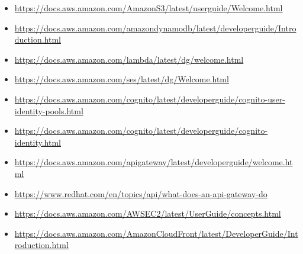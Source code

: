 \begin{itemize}
    \item \href{https://docs.aws.amazon.com/AmazonS3/latest/userguide/Welcome.html}{https://docs.aws.amazon.com/AmazonS3/latest/userguide/Welcome.html}
    \item \href{https://docs.aws.amazon.com/amazondynamodb/latest/developerguide/Introduction.html}{https://docs.aws.amazon.com/amazondynamodb/latest/developerguide/Introduction.html}
    \item \href{https://docs.aws.amazon.com/lambda/latest/dg/welcome.html}{https://docs.aws.amazon.com/lambda/latest/dg/welcome.html}
    \item \href{https://docs.aws.amazon.com/ses/latest/dg/Welcome.html}{https://docs.aws.amazon.com/ses/latest/dg/Welcome.html}
    \item \href{https://docs.aws.amazon.com/cognito/latest/developerguide/cognito-user-identity-pools.html}{https://docs.aws.amazon.com/cognito/latest/developerguide/cognito-user-identity-pools.html}
    \item \href{https://docs.aws.amazon.com/cognito/latest/developerguide/cognito-identity.html}{https://docs.aws.amazon.com/cognito/latest/developerguide/cognito-identity.html}
    \item \href{https://docs.aws.amazon.com/apigateway/latest/developerguide/welcome.html}{https://docs.aws.amazon.com/apigateway/latest/developerguide/welcome.html}
    \item \href{https://www.redhat.com/en/topics/api/what-does-an-api-gateway-do}{https://www.redhat.com/en/topics/api/what-does-an-api-gateway-do}
    \item \href{https://docs.aws.amazon.com/AWSEC2/latest/UserGuide/concepts.html}{https://docs.aws.amazon.com/AWSEC2/latest/UserGuide/concepts.html}
    \item \href{https://docs.aws.amazon.com/AmazonCloudFront/latest/DeveloperGuide/Introduction.html}{https://docs.aws.amazon.com/AmazonCloudFront/latest/DeveloperGuide/Introduction.html}
\end{itemize}